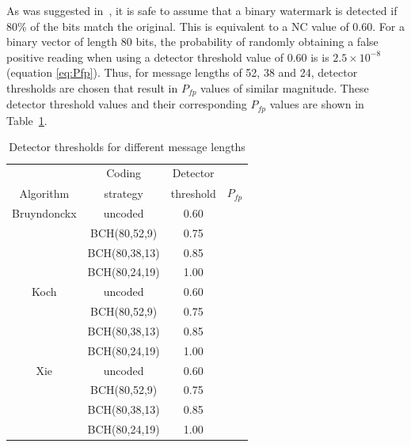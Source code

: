 \documentclass[10pt,twocolumn]{article}
\begin{document}
As was suggested in~\cite{petit99}, it is safe to assume that a binary watermark
is detected if 80\% of the bits match the original. This is equivalent to a NC value of 0.60. For a binary vector
of length 80 bits, the probability of randomly obtaining a false positive reading when using a detector threshold
value of 0.60 is is $2.5 \times 10^{-8}$ (equation \ref{eq:Pfp}). Thus, for message lengths of 52, 38 and 24, detector
thresholds are chosen that result in $P_{\mathit fp}$ values of similar magnitude. These detector threshold values and
their corresponding $P_{\mathit fp}$ values are shown in Table~\ref{tab:80ResBKX}.
\begin{table}[!htb]
\footnotesize
        \begin{center}
		\begin{tabular}{|c|c|c|c|} \hline
				& Coding		& Detector	& 		\\ 
		Algorithm 	& strategy		& threshold	& $P_{fp}$ 	\\\hline\hline

		Bruyndonckx	& uncoded		& 0.60		& \raisebox{-0.3ex}{ $2.5\times 10^{-8}$ }	\\ \cline{2-4}
				& BCH(80,52,9)		& 0.75		& \raisebox{-0.4ex}{ $3.5\times 10^{-8}$ }	\\ \cline{2-4}
				& BCH(80,38,13)		& 0.85		& \raisebox{-0.4ex}{ $3.3\times 10^{-8}$ }	\\ \cline{2-4}
				& BCH(80,24,19)		& 1.00		& \raisebox{-0.4ex}{ $6.0\times 10^{-8}$ }	\\ \hline\hline

		Koch 		& uncoded		& 0.60		& \raisebox{-0.3ex}{ $2.5\times 10^{-8}$ }	\\ \cline{2-4}
				& BCH(80,52,9)		& 0.75		& \raisebox{-0.4ex}{ $3.5\times 10^{-8}$ }	\\ \cline{2-4}
				& BCH(80,38,13)   	& 0.85  	& \raisebox{-0.4ex}{ $3.3\times 10^{-8}$ }	\\ \cline{2-4}	
				& BCH(80,24,19)		& 1.00		& \raisebox{-0.4ex}{ $6.0\times 10^{-8}$ }	\\ \hline\hline	

		Xie		& uncoded               & 0.60		& \raisebox{-0.3ex}{ $2.5\times 10^{-8}$ }	\\ \cline{2-4}
				& BCH(80,52,9)          & 0.75		& \raisebox{-0.4ex}{ $3.5\times 10^{-8}$ }	\\ \cline{2-4} 	
				& BCH(80,38,13)         & 0.85 		& \raisebox{-0.4ex}{ $3.3\times 10^{-8}$ }	\\ \cline{2-4} 
				& BCH(80,24,19)         & 1.00		& \raisebox{-0.4ex}{ $6.0\times 10^{-8}$ }	\\ \hline 
	\end{tabular} 
	\caption{Detector thresholds for different message lengths}
	\label{tab:80ResBKX}
	\end{center}
\end{table}
\end{document}
